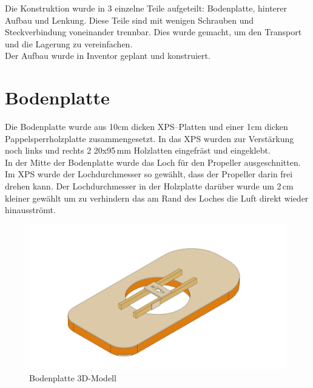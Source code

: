 Die Konstruktion wurde in 3 einzelne Teile aufgeteilt: Bodenplatte, hinterer Aufbau und Lenkung. Diese Teile sind mit wenigen Schrauben und Steckverbindung voneinander trennbar. Dies wurde gemacht, um den Transport und die Lagerung zu vereinfachen.\\
Der Aufbau wurde in Inventor geplant und konstruiert.


\newpage
\section{Bodenplatte}
Die Bodenplatte wurde aus 10cm dicken XPS--Platten und einer 1cm dicken Pappelsperrholzplatte zusammengesetzt. In das XPS wurden zur Verstärkung noch links und rechts 2 20x95\,mm Holzlatten eingefräst und eingeklebt.\\ 
In der Mitte der Bodenplatte wurde das Loch für den Propeller ausgeschnitten. Im XPS wurde der Lochdurchmesser so gewählt, dass der Propeller darin frei drehen kann. Der Lochdurchmesser in der Holzplatte darüber wurde um 2\,cm kleiner gewählt um zu verhindern das am Rand des Loches die Luft direkt wieder hinausströmt.

\begin{figure}[H]
    \centering
    \includegraphics[width=\textwidth]{../../../../Inventor/Bodenplatte/png/BodenplatteHauptansicht.png}
    \caption{Bodenplatte 3D-Modell\label{fig:konst:bodenplatte:gesamt}}
\end{figure}

